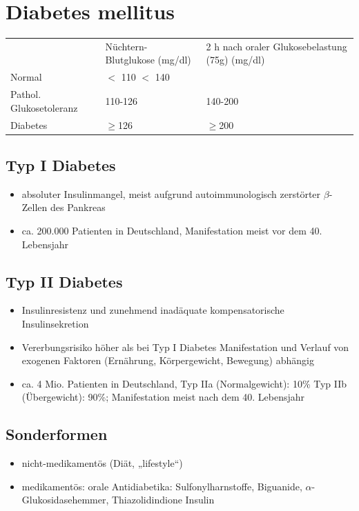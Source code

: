 \documentclass[10pt,a4paper]{report}
\begin{document}
\section{Diabetes mellitus} %
\label{sec:diabetes_mellitus}

\begin{tabularx}{\textwidth}{XXX}
&Nüchtern-Blutglukose (mg/dl) &2 h nach oraler Glukosebelastung (75g) (mg/dl)\\
Normal& $<$ 110 $<$ 140\\
Pathol. Glukosetoleranz&110-126&140-200\\
Diabetes&$\geq$126&$\geq$200\\
\end{tabularx}
\subsection{Typ I Diabetes} %
\label{ssub:typ_i_diabetes}
\begin{itemize}
	\item absoluter Insulinmangel, meist aufgrund autoimmunologisch zerstörter $\beta$-Zellen des Pankreas 
	\item ca. 200.000 Patienten in Deutschland, Manifestation meist vor dem 40. 	Lebensjahr
\end{itemize}
\subsection{Typ II Diabetes} %
\label{ssub:typ_ii_diabetes}
\begin{itemize}
	\item Insulinresistenz und zunehmend inadäquate kompensatorische Insulinsekretion
	\item Vererbungsrisiko höher als bei Typ I Diabetes Manifestation und Verlauf von exogenen Faktoren (Ernährung, Körpergewicht, Bewegung) abhängig
	\item ca. 4 Mio. Patienten in Deutschland, Typ IIa (Normalgewicht): 10\% Typ IIb (Übergewicht): 90\%; Manifestation meist nach dem 40. Lebensjahr
\end{itemize}
\subsection{Sonderformen} %
\label{ssub:sonderformen}
\begin{itemize}
	\item nicht-medikamentös (Diät, „lifestyle“)
	\item medikamentös: 	orale Antidiabetika: Sulfonylharnstoffe, Biguanide, $\alpha$-Glukosidasehemmer, Thiazolidindione Insulin
\end{itemize}
\end{document}
